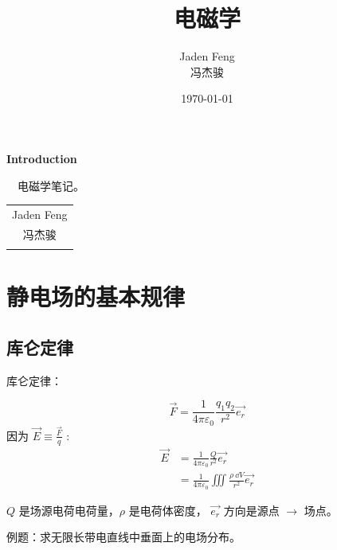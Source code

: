 \documentclass[cn,hazy,blue,14pt,normal]{elegantnote}
\title{电磁学}
\author{Jaden Feng\\冯杰骏}
\date{}
\numberwithin{equation}{section}
\begin{document}
\maketitle
{}
\setcounter{page}{1}
\newpage
\begin{center}
    \Huge\textbf{{Introduction}}\\
\end{center}~\
电磁学笔记。
\begin{flushright}
    \begin{tabular}{c}
        Jaden Feng\\
        冯杰骏\\
        \date{\today}
    \end{tabular}
\end{flushright}

\newpage
{}
\setcounter{page}{1}
\tableofcontents

\newpage
\setcounter{page}{1}

\section{静电场的基本规律}
\newpage
\subsection{库仑定律}
\begin{theorem}
  库仑定律：
\end{theorem}
\begin{equation}
  \vec{F}=\frac{1}{4\pi\varepsilon_0}\frac{q_1q_2}{r^2}\vec{e_r}
\end{equation}
因为 $\vec{E}\equiv\frac{\vec{F}}{q}$ :
\begin{equation}
  \begin{aligned}
    \vec{E}&=\frac{1}{4\pi\varepsilon_0}\frac{Q}{r^2}\vec{e_r}\\
    &=\frac{1}{4\pi\varepsilon_0}\iiint\frac{\rho\ \dd V}{r^2}\vec{e_r}
  \end{aligned}
\end{equation}

$Q$ 是场源电荷电荷量，$\rho$ 是电荷体密度， $\vec{e_r}$ 方向是源点 $\to $ 场点。\\
\begin{example}\label{example1.1}
  例题：求无限长带电直线中垂面上的电场分布。
\end{example}
\end{document}
